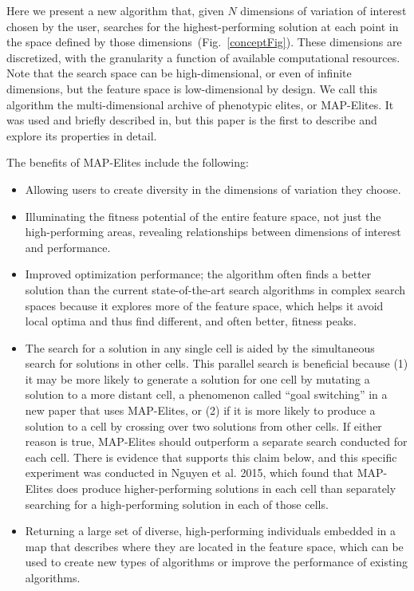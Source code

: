 \documentclass[twocolumn, DIV25, 9pt]{scrartcl}
\begin{document}
Here we present a new algorithm that, given $N$ dimensions of variation of interest chosen by the user, searches for the highest-performing solution at each point in the space defined by those dimensions~(Fig.~\ref{conceptFig}). These dimensions are discretized, with the granularity a function of available computational resources. Note that the search space can be high-dimensional, or even of infinite dimensions, but the feature space is low-dimensional by design. We call this algorithm the multi-dimensional archive of phenotypic elites, or MAP-Elites. It was used and briefly described in\cite{cully2015robots}, but this paper is the first to describe and explore its properties in detail.



The benefits of MAP-Elites include the following:

\begin{itemize}
\item Allowing users to create diversity in the dimensions of variation they choose.

\item Illuminating the fitness potential of the entire feature space, not just the high-performing areas, revealing relationships between dimensions of interest and performance.

\item Improved optimization performance; the algorithm often finds a better solution than the current state-of-the-art search algorithms in complex search spaces because it explores more of the feature space, which helps it avoid local optima and thus find different, and often better, fitness peaks. 

\item The search for a solution in any single cell is aided by the simultaneous search for solutions in other cells. This parallel search is beneficial because (1) it may be more likely to generate a solution for one cell by mutating a solution to a more distant cell, a phenomenon called ``goal switching'' in a new paper that uses MAP-Elites\cite{nguyen2015introducing}, or (2) if it is more likely to produce a solution to a cell by crossing over two solutions from other cells. If either reason is true, MAP-Elites should outperform a separate search conducted for each cell. There is evidence that supports this claim below, and this specific experiment was conducted in Nguyen et al. 2015\cite{nguyen2015introducing}, which found that MAP-Elites does produce higher-performing solutions in each cell than separately searching for a high-performing solution in each of those cells. 

\item Returning a large set of diverse, high-performing individuals embedded in a map that describes where they are located in the feature space, which can be used to create new types of algorithms  or improve the performance of existing algorithms\cite{cully2015robots}.

\end{itemize}
\end{document}

